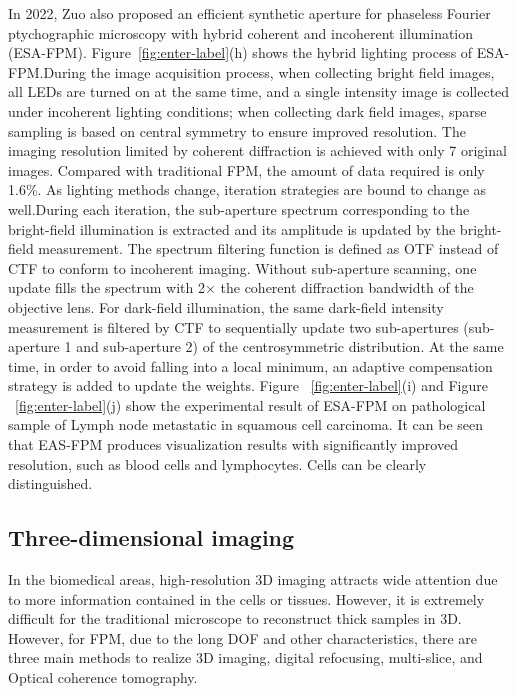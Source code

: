 \documentclass[journal,review,submit,pdftex,moreauthors]{Definitions/mdpi}
\begin{document}
In 2022, Zuo also proposed an efficient synthetic aperture for phaseless Fourier ptychographic microscopy with hybrid coherent and incoherent illumination (ESA-FPM). Figure~\ref{fig:enter-label}(h) shows the hybrid lighting process of ESA-FPM.During the image acquisition process, when collecting bright field images, all LEDs are turned on at the same time, and a single intensity image is collected under incoherent lighting conditions; when collecting dark field images, sparse sampling is based on central symmetry to ensure improved resolution. The imaging resolution limited by coherent diffraction is achieved with only 7 original images. Compared with traditional FPM, the amount of data required is only 1.6\%. As lighting methods change, iteration strategies are bound to change as well.During each iteration, the sub-aperture spectrum corresponding to the bright-field illumination is extracted and its amplitude is updated by the bright-field measurement. The spectrum filtering function is defined as OTF instead of CTF to conform to incoherent imaging. Without sub-aperture scanning, one update fills the spectrum with 2× the coherent diffraction bandwidth of the objective lens. For dark-field illumination, the same dark-field intensity measurement is filtered by CTF to sequentially update two sub-apertures (sub-aperture 1 and sub-aperture 2) of the centrosymmetric distribution\cite{fan2023efficient}. At the same time, in order to avoid falling into a local minimum, an adaptive compensation strategy is added to update the weights. Figure ~\ref{fig:enter-label}(i) and Figure ~\ref{fig:enter-label}(j) show the experimental result of ESA-FPM on pathological sample of Lymph node metastatic in squamous cell carcinoma. It can be seen that EAS-FPM produces visualization results with significantly improved resolution, such as blood cells and lymphocytes. Cells can be clearly distinguished.

\subsection{Three-dimensional imaging}
In the biomedical areas, high-resolution 3D imaging attracts wide attention due to more information contained in the cells or tissues. However, it is extremely difficult for the traditional microscope to reconstruct thick samples in 3D. However, for FPM, due to the long DOF \cite{zheng2013wide} and other characteristics, there are three main methods to realize 3D imaging, digital refocusing, multi-slice, and Optical coherence tomography. 
\end{document}
